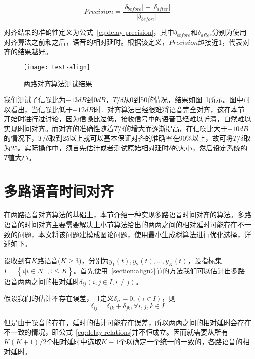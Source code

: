 \begin{equation}\label{eq:delay-precision}
Precision=\frac{|\delta_{before}|-|\delta_{after}|}{|\delta_{before}|}
\end{equation}

对齐结果的准确性定义为公式~\ref{eq:delay-precision}，其中$\delta_{before}$和$\delta_{after}$分别为使用对齐算法之前和之后，语音的相对延时。根据该定义，$Precision$越接近$1$，代表对齐的结果越好。

\begin{figure}
\centering
\texttt{[image: test-align]}
\caption{两路对齐算法测试结果\label{fig:test-align}}
\end{figure}

我们测试了信噪比为$-13dB$到$0dB$，$T/\delta$从0到50的情况，结果如图~\ref{fig:test-align}所示。图中可以看出，当信噪比低于$-12dB$时，对齐算法已经很难将语音完全对齐，这在本节开始时进行过讨论，因为信噪比过低，接收信号中的语音已经难以听清，自然难以实现时间对齐。而对齐的准确性随着$T/\delta$的增大而逐渐提高，在信噪比大于$-10dB$的情况下，$T/\delta$取到25以上就可以基本保证对齐的准确率在90\%以上，故可将$T/\delta$取为25。实际操作中，须首先估计或者测试原始相对延时$\delta$的大小，然后设定系统的$T$值大小。


\section{多路语音时间对齐} \label{section:align-multi}

在两路语音对齐算法的基础上，本节介绍一种实现多路语音时间对齐的算法。多路语音的时间对齐主要需要解决上小节算法给出的两两之间的相对延时可能存在不一致的问题，本文将该问题建模成图论问题，使用最小生成树算法进行优化选择，详述如下。

设收到有$K$路语音$(K\geq3$)，分别为$y_1(t), y_2(t), ..., y_K(t)$，设指标集$I=\left\{i|i\in N^+, i\leq K\right\}$。首先使用~\ref{section:align2}节的方法我们可以估计出多路语音两两之间的相对延时$\delta_{ij}  (i,j\in I,i\neq j)$。

假设我们的估计不存在误差，且定义$\delta_{ii}=0,(i \in I)$，则
\begin{equation}\label{eq:delay-relations}
\delta_{ij}=\delta_{ik}+\delta_{jk}, \forall i,j,k \in I
\end{equation}

但是由于噪音的存在，延时的估计可能存在误差，所以两两之间的相对延时会存在不一致的情况，即公式~\ref{eq:delay-relations}并不恒成立。因而就需要从所有$K(K+1)/2$个相对延时中选取$K-1$个以确定一个统一的一致的，各路语音的相对延时。

